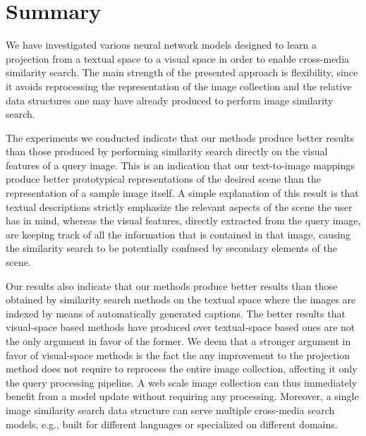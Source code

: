 \section{Summary}
\label{sec:t2v:conclusions}

We have investigated various neural network models designed to learn a projection from a textual space to a visual space in order to enable cross-media similarity search.
The main strength of the presented approach is flexibility, since it avoids reprocessing the representation of the image collection and the relative data structures one may have already produced to perform image similarity search.

The experiments we conducted indicate that our methods produce better results than those produced by performing similarity search directly on the visual features of a query image.
This is an indication that our text-to-image mappings produce better prototypical representations of the desired scene than the representation of a sample image itself.
A simple explanation of this result is that textual descriptions strictly emphasize the relevant aspects of the scene the user has in mind, whereas the visual features, directly extracted from the query image, are keeping track of all the information that is contained in that image, causing the similarity search to be potentially confused by secondary elements of the scene.

Our results also indicate that our methods produce better results than those obtained by similarity search methods on the textual space where the images are indexed by means of automatically generated captions.
The better results that visual-space based methods have produced over textual-space based ones are not the only argument in favor of the former.
We deem that a stronger argument in favor of visual-space methods is the fact the any improvement to the projection method does not require to reprocess the entire image collection, affecting it only the query processing pipeline.
A web scale image collection can thus immediately benefit from a model update without requiring any processing.
Moreover, a single image similarity search data structure can serve multiple cross-media search models, e.g., built for different languages or specialized on different domains.

